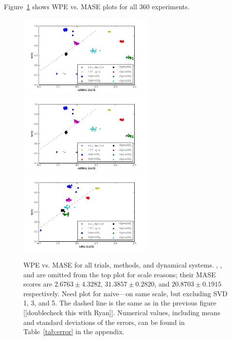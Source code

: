 Figure~\ref{fig:wpe_vs_mase_all} shows WPE vs. MASE plots for all 360
experiments.
\begin{figure}
  \centering
    \includegraphics[width=0.6\textwidth]{figs/ARIMA_prediction_vs_entropy}
    \includegraphics[width=0.6\textwidth]{figs/ARIMA_prediction_vs_entropy}
    \includegraphics[width=0.6\textwidth]{figs/LMA_prediction_vs_entropy}
\caption{WPE vs. MASE for all trials, methods, and dynamical systems.
  \svdone, \svdthree, and \svdfive are omitted from the top plot for
  scale reasons; their MASE scores are $2.6763\pm4.3282$, $31.3857\pm
  0.2820$, and $20.8703 \pm 0.1915$ respectively.  {\color{red}Need
    plot for naive---on same scale, but excluding SVD 1, 3, and 5}.
  The dashed line is the same as in the previous figure [[doublecheck
      this with Ryan]].  Numerical values, including means and
  standard deviations of the errors, can be found in
  Table~\ref{tab:error} in the appendix.
% 
% 
}
    \label{fig:wpe_vs_mase_all}
\end{figure} 
